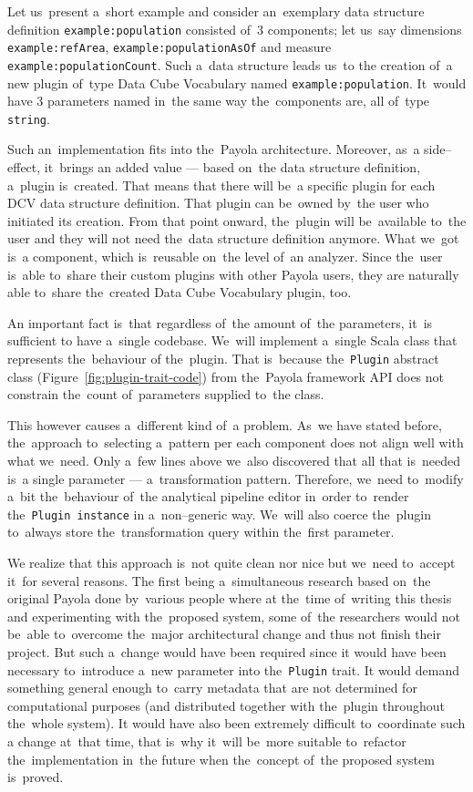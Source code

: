 \begin{sloppypar}
Let us~present a~short example and consider an~exemplary data structure definition \texttt{example:population}
consisted of~3 
components; let us~say dimensions \texttt{example:refArea}, \texttt{example:populationAsOf}
and measure \texttt{example:populationCount}. Such a~data structure leads us~to 
the creation of~a new plugin of~type Data Cube Vocabulary named 
\texttt{example:population}. It~would have 3 parameters named in~the same way the~components are, all of~type \texttt{string}.
\end{sloppypar}

Such an~implementation fits into the~Payola architecture. Moreover, as~a side--effect, it~brings
an added value --- based on~the data structure definition, a~plugin is~created. 
That means that there will be~a specific plugin for each DCV data structure 
definition. That plugin can be~owned by~the user who initiated its creation. 
From that point onward, the~plugin will be~available to~the user and they
will not need the~data structure definition anymore. What we~got is~a 
component, which is~reusable on~the level of~an analyzer. Since the~user is~able to~share their custom plugins with other Payola users, they are
naturally able to~share the~created Data Cube Vocabulary plugin, too. 

An important fact is~that regardless of~the amount of~the parameters, it~is sufficient 
to have a~single codebase. We~will implement a~single Scala class that represents the~behaviour 
of the~plugin. That is~because the~\texttt{Plugin} abstract class (Figure~\ref{fig:plugin-trait-code})
from the~Payola framework
API does not constrain the~count of~parameters supplied to~the class.

This however causes a~different kind of~a problem. As~we have stated before, the~approach to~selecting a~pattern per each component does not align well with what we~need. Only a~few lines above we~also discovered that all that is~needed is~a 
single parameter --- a~transformation pattern. Therefore, we~need to~modify a~bit the~behaviour of~the analytical pipeline editor in~order to~render the~\texttt{Plugin instance}
in a~non--generic way. We~will also coerce the~plugin to~always store the~transformation query 
within the~first parameter.

We realize that this approach is~not quite clean nor nice but we~need to~accept it~for several reasons.
The first being a~simultaneous research based on~the original Payola done by~various people where
at the~time of~writing this thesis and experimenting with the~proposed system, some of~the researchers 
would not be~able to~overcome the~major architectural change and thus not finish their project.
But such a~change would have been required since 
it would have been necessary to~introduce a~new parameter into the~\texttt{Plugin} trait. 
It would demand something general enough to~carry metadata that are not determined for 
computational purposes (and distributed together with the~plugin throughout the~whole system).
It would have also been extremely difficult to~coordinate such 
a change at~that time, that is~why it~will be~more suitable to~refactor the~implementation in~the future when the~concept of~the proposed system is~proved.

